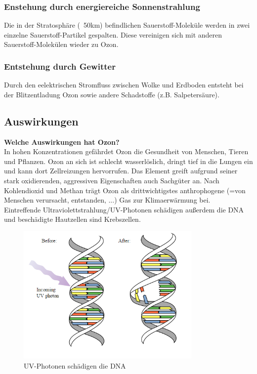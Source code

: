 \documentclass[11pt, a4paper]{article}
\begin{document}
\subsubsection{Enstehung durch energiereiche Sonnenstrahlung}
Die in der Stratosphäre (~50km) befindlichen Sauerstoff-Moleküle werden in zwei einzelne Sauerstoff-Partikel gespalten. Diese vereinigen sich mit anderen Sauerstoff-Molekülen wieder zu Ozon.
\subsubsection{Entstehung durch Gewitter}
Durch den eelektrischen Stromfluss zwischen Wolke und Erdboden entsteht bei der Blitzentladung Ozon sowie andere Schadstoffe (z.B. Salpetersäure).

\newpage
\subsection{Auswirkungen}
\textbf{Welche Auswirkungen hat Ozon?}\\
In hohen Konzentrationen gefährdet Ozon die Gesundheit von Menschen, Tieren und Pflanzen. Ozon an sich ist schlecht wasserlöslich, dringt tief in die Lungen ein und kann dort Zellreizungen hervorrufen. Das Element greift aufgrund seiner stark oxidierenden, aggressiven Eigenschaften auch Sachgüter an. Nach Kohlendioxid und Methan trägt Ozon als drittwichtigstes anthrophogene (=von Menschen verursacht, entstanden, ...) Gas zur Klimaerwärmung bei. \\

Eintreffende Ultraviolettstrahlung/UV-Photonen schädigen außerdem die DNA und beschädigte Hautzellen sind Krebszellen.

\begin{figure}[h!]
	\centering
	\includegraphics[width=0.8\textwidth]{images/dna}
	\caption{UV-Photonen schädigen die DNA}
\end{figure}
\end{document}
